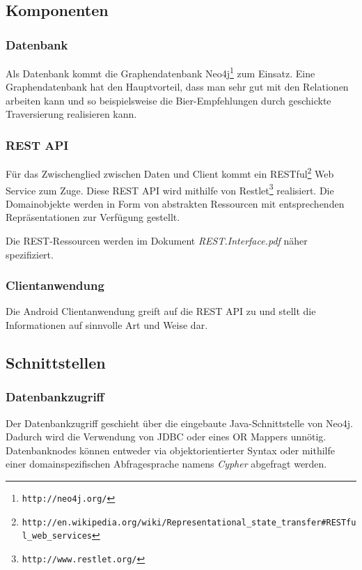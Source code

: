 \documentclass[10pt,a4paper]{scrartcl}
\begin{document}
\subsection{Komponenten}

\subsubsection{Datenbank}

Als Datenbank kommt die Graphendatenbank Neo4j\footnote{\texttt{http://neo4j.org/}} zum Einsatz.
Eine Graphendatenbank hat den Hauptvorteil, dass man sehr gut mit den Relationen arbeiten kann und
so beispielsweise die Bier-Empfehlungen durch geschickte Traversierung realisieren kann.

\subsubsection{REST API}

Für das Zwischenglied zwischen Daten und Client kommt ein
RESTful\footnote{\texttt{http://en.wikipedia.org/wiki/Representational\_state\_transfer\#RESTful\_web\_services}}
Web Service zum Zuge. Diese REST API wird mithilfe von
Restlet\footnote{\texttt{http://www.restlet.org/}} realisiert. Die Domainobjekte werden in Form von
abstrakten Ressourcen mit entsprechenden Repräsentationen zur Verfügung gestellt.

Die REST-Ressourcen werden im Dokument \textit{REST.Interface.pdf} näher spezifiziert.

\subsubsection{Clientanwendung}

Die Android Clientanwendung greift auf die REST API zu und stellt die Informationen auf sinnvolle
Art und Weise dar.


\subsection{Schnittstellen}

\subsubsection{Datenbankzugriff}

Der Datenbankzugriff geschieht über die eingebaute Java-Schnittstelle von Neo4j. Dadurch wird die
Verwendung von JDBC oder eines OR Mappers unnötig. Datenbanknodes können entweder via
objektorientierter Syntax oder mithilfe einer domainspezifischen Abfragesprache namens
\textit{Cypher} abgefragt werden.
\end{document}

